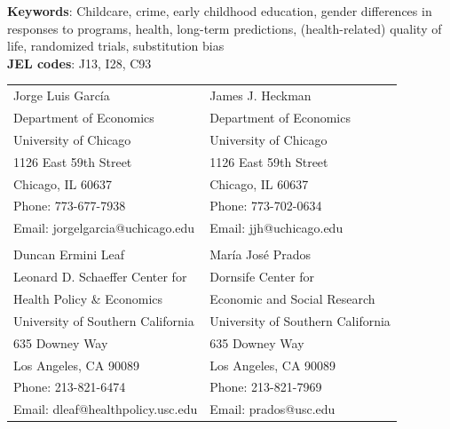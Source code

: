 \noindent \textbf{Keywords}: Childcare, crime, early childhood education, gender differences in responses to programs, health, long-term predictions, (health-related) quality of life, randomized trials, substitution bias \\
\noindent \textbf{JEL codes}: J13, I28, C93

\bigskip

\begin{tabular}{ll}
Jorge Luis Garc\'{i}a                                       & James J. Heckman \\
Department of Economics                                & Department of Economics \\
University of Chicago                                       & University of Chicago \\
1126 East 59th Street                                     & 1126 East 59th Street \\
Chicago, IL 60637                                           & Chicago, IL 60637 \\
Phone: 773-677-7938                                     & Phone: 773-702-0634  \\
Email: jorgelgarcia@uchicago.edu                       & Email: jjh@uchicago.edu \\
                                                                       & \\
Duncan Ermini Leaf                                           & Mar\'{i}a Jos\'{e} Prados \\
Leonard D. Schaeffer Center for            & Dornsife Center for  \\
Health Policy \& Economics                                          & Economic and Social Research \\
University of Southern California                        & University of Southern California \\
635 Downey Way                                             & 635 Downey Way        \\                                                        
Los Angeles, CA 90089                                    & Los Angeles, CA 90089 \\
Phone: 213-821-6474                                     & Phone: 213-821-7969 \\
Email: dleaf@healthpolicy.usc.edu                     & Email: prados@usc.edu \\

\end{tabular}


